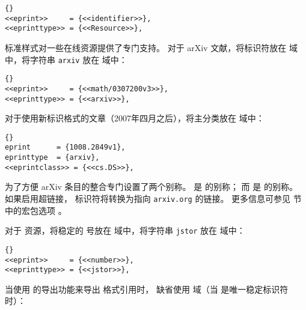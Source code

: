 \begin{lstlisting}[style=bibtex]{}
<<eprint>>     = {<<identifier>>},
<<eprinttype>> = {<<Resource>>},
\end{lstlisting}
%
标准样式对一些在线资源提供了专门支持。
对于 arXiv 文献，将标识符放在  域中，将字符串 \texttt{arxiv} 放在  域中：

\begin{lstlisting}[style=bibtex]{}
<<eprint>>     = {<<math/0307200v3>>},
<<eprinttype>> = {<<arxiv>>},
\end{lstlisting}
%
对于使用新标识格式的文章（2007年四月之后），将主分类放在  域中：

\begin{lstlisting}[style=bibtex]{}
eprint      = {1008.2849v1},
eprinttype  = {arxiv},
<<eprintclass>> = {<<cs.DS>>},
\end{lstlisting}
%
为了方便 arXiv 条目的整合专门设置了两个别称。
 是  的别称；
而  是  的别称。
如果启用超链接， 标识符将转换为指向 \nolinkurl{arxiv.org} 的链接。
更多信息可参见  节中的宏包选项 。

对于  资源，将稳定的  号放在  域中，将字符串 \texttt{jstor} 放在  域中：

\begin{lstlisting}[style=bibtex]{}
<<eprint>>     = {<<number>>},
<<eprinttype>> = {<<jstor>>},
\end{lstlisting}
%
当使用  的导出功能来导出 \BibTeX 格式引用时，
 缺省使用  域（当  是唯一稳定标识符时）：

